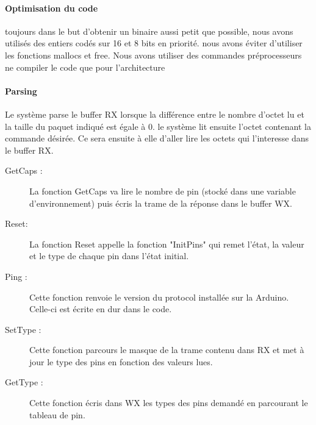\paragraph{Optimisation du code}
toujours dans le but d'obtenir un binaire aussi petit que possible,
nous avons utilisés des entiers codés sur 16 et 8 bits en
priorité. nous avons éviter d'utiliser les fonctions mallocs et
free. Nous avons utiliser des commandes préprocesseurs ne compiler 
le code que pour l'architecture 

\paragraph{Parsing} 

Le système parse le buffer RX lorsque la différence entre le nombre
d'octet lu et la taille du paquet indiqué est égale à 0. le système
lit ensuite l'octet contenant la commande désirée. Ce sera ensuite à
elle d'aller lire les octets qui l'interesse dans le buffer RX.

\begin{description}
\item[GetCaps :] La fonction GetCaps va lire le nombre de pin (stocké dans une variable d'environnement) puis écris la trame de la réponse dans le buffer WX.
\item[Reset:] La fonction Reset appelle la fonction "InitPins" qui remet l'état, la valeur et le type de chaque pin dans l'état initial.
\item[Ping :] Cette fonction renvoie le version du protocol installée sur la Arduino. Celle-ci est écrite en dur dans le code.
\item[SetType :] Cette fonction parcours le masque de la trame contenu dans RX et met à jour le type des pins en fonction des valeurs lues.
\item[GetType :] Cette fonction écris dans WX les types des pins demandé en parcourant le tableau de pin.
\end{description}
